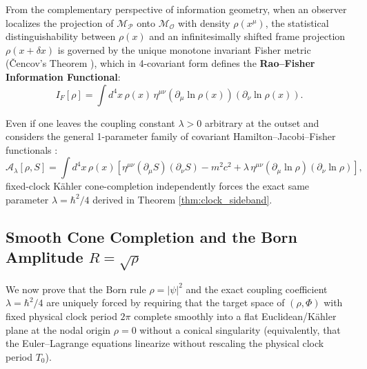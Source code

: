 \documentclass[11pt, a4paper]{article}
\theoremstyle{definition}
\begin{document}
From the complementary perspective of information geometry, when an observer localizes the projection of $\mathcal{M}_{\mathcal{P}}$ onto $\mathcal{M}_{\mathcal{O}}$ with density $\rho(x^\mu)$, the statistical distinguishability between $\rho(x)$ and an infinitesimally shifted frame projection $\rho(x + \delta x)$ is governed by the unique monotone invariant Fisher metric (\v{C}encov's Theorem \cite{Cencov1982}), which in 4-covariant form defines the \textbf{Rao--Fisher Information Functional}:
\begin{equation}
\label{eq:Fisher_functional}
I_F[\rho] = \int d^4x \, \rho(x) \, \eta^{\mu\nu} \left( \partial_\mu \ln \rho(x) \right) \left( \partial_\nu \ln \rho(x) \right).
\end{equation}

Even if one leaves the coupling constant $\lambda > 0$ arbitrary at the outset and considers the general 1-parameter family of covariant Hamilton--Jacobi--Fisher functionals \cite{Reginatto1998, HallReginatto2002}:
\begin{equation}
\label{eq:general_lambda_action}
\mathcal{A}_\lambda[\rho, S] = \int d^4x \, \rho(x) \left[ \eta^{\mu\nu} (\partial_\mu S)(\partial_\nu S) - m^2 c^2 + \lambda \, \eta^{\mu\nu} (\partial_\mu \ln \rho)(\partial_\nu \ln \rho) \right],
\end{equation}
fixed-clock K\"{a}hler cone-completion independently forces the exact same parameter $\lambda = \hbar^2/4$ derived in Theorem \ref{thm:clock_sideband}.

\subsection{Smooth Cone Completion and the Born Amplitude \texorpdfstring{$R = \sqrt{\rho}$}{R = sqrt(rho)}}
\label{sec:cone_completion}

We now prove that the Born rule $\rho = |\psi|^2$ and the exact coupling coefficient $\lambda = \hbar^2/4$ are uniquely forced by requiring that the target space of $(\rho, \Phi)$ with fixed physical clock period $2\pi$ complete smoothly into a flat Euclidean/K\"{a}hler plane at the nodal origin $\rho = 0$ without a conical singularity (equivalently, that the Euler--Lagrange equations linearize without rescaling the physical clock period $T_0$).
\end{document}
